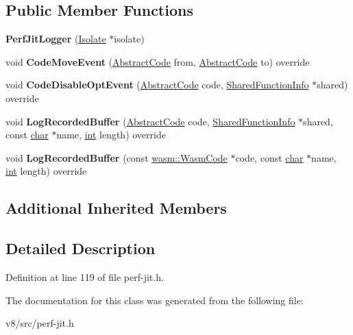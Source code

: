 \subsection*{Public Member Functions}
\begin{DoxyCompactItemize}
\item 
\mbox{\label{classv8_1_1internal_1_1PerfJitLogger_afe5292aca094f811dbdeff455836384a}} 
{\bfseries Perf\+Jit\+Logger} (\mbox{\hyperlink{classv8_1_1internal_1_1Isolate}{Isolate}} $\ast$isolate)
\item 
\mbox{\label{classv8_1_1internal_1_1PerfJitLogger_ac44efe0f74fbdb26bf607f4bc924a391}} 
void {\bfseries Code\+Move\+Event} (\mbox{\hyperlink{classv8_1_1internal_1_1AbstractCode}{Abstract\+Code}} from, \mbox{\hyperlink{classv8_1_1internal_1_1AbstractCode}{Abstract\+Code}} to) override
\item 
\mbox{\label{classv8_1_1internal_1_1PerfJitLogger_a3860c124c4bde13b09bdadbcce3e38ca}} 
void {\bfseries Code\+Disable\+Opt\+Event} (\mbox{\hyperlink{classv8_1_1internal_1_1AbstractCode}{Abstract\+Code}} code, \mbox{\hyperlink{classv8_1_1internal_1_1SharedFunctionInfo}{Shared\+Function\+Info}} $\ast$shared) override
\item 
\mbox{\label{classv8_1_1internal_1_1PerfJitLogger_ad71b7b9878e4faa6c1b536dc7c36aafe}} 
void {\bfseries Log\+Recorded\+Buffer} (\mbox{\hyperlink{classv8_1_1internal_1_1AbstractCode}{Abstract\+Code}} code, \mbox{\hyperlink{classv8_1_1internal_1_1SharedFunctionInfo}{Shared\+Function\+Info}} $\ast$shared, const \mbox{\hyperlink{classchar}{char}} $\ast$name, \mbox{\hyperlink{classint}{int}} length) override
\item 
\mbox{\label{classv8_1_1internal_1_1PerfJitLogger_a26a1ac199d622c6fb24d6b5eb05b5448}} 
void {\bfseries Log\+Recorded\+Buffer} (const \mbox{\hyperlink{classv8_1_1internal_1_1wasm_1_1WasmCode}{wasm\+::\+Wasm\+Code}} $\ast$code, const \mbox{\hyperlink{classchar}{char}} $\ast$name, \mbox{\hyperlink{classint}{int}} length) override
\end{DoxyCompactItemize}
\subsection*{Additional Inherited Members}


\subsection{Detailed Description}


Definition at line 119 of file perf-\/jit.\+h.



The documentation for this class was generated from the following file\+:\begin{DoxyCompactItemize}
\item 
v8/src/perf-\/jit.\+h\end{DoxyCompactItemize}
